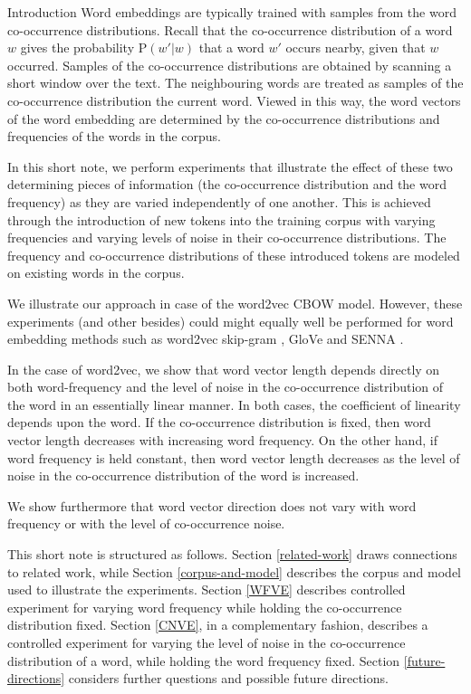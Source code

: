 \documentclass{article} %
\newcommand{\p}{\text{P}}
\begin{document}
\begin{section}{Introduction}
Word embeddings are typically trained with samples from the word co-occurrence distributions.
Recall that the co-occurrence distribution of a word $w$ gives the probability $\p(w'|w)$ that a word $w'$ occurs nearby, given that $w$ occurred.
Samples of the co-occurrence distributions are obtained by scanning a short window over the text.
The neighbouring words are treated as samples of the co-occurrence distribution the current word. 
Viewed in this way, the word vectors of the word embedding are determined by the co-occurrence distributions and frequencies of the words in the corpus.

In this short note, we perform experiments that illustrate the effect of these two determining pieces of information (the co-occurrence distribution and the word frequency) as they are varied independently of one another.
This is achieved through the introduction of new tokens into the training corpus with varying frequencies and varying levels of noise in their co-occurrence distributions.
The frequency and co-occurrence distributions of these introduced tokens are modeled on existing words in the corpus.

We illustrate our approach in case of the word2vec CBOW model.
However, these experiments (and other besides) could might equally well be performed for word embedding methods such as word2vec skip-gram \cite{DistRepns,EfficientEstimation}, GloVe \cite{pennington2014glove} and SENNA \cite{collobert-2011}.

In the case of word2vec, we show that word vector length depends directly on both word-frequency and the level of noise in the co-occurrence distribution of the word in an essentially linear manner.
In both cases, the coefficient of linearity depends upon the word.
If the co-occurrence distribution is fixed, then word vector length decreases with increasing word frequency.
On the other hand, if word frequency is held constant, then word vector length decreases as the level of  noise in the co-occurrence distribution of the word is increased.

We show furthermore that word vector direction does not vary with word frequency or with the level of co-occurrence noise.

This short note is structured as follows.
Section \ref{related-work} draws connections to related work, while Section \ref{corpus-and-model} describes the corpus and model used to illustrate the experiments.
Section \ref{WFVE} describes controlled experiment for varying word frequency while holding the co-occurrence distribution fixed.
Section \ref{CNVE}, in a complementary fashion, describes a controlled experiment for varying the level of noise in the co-occurrence distribution of a word, while holding the word frequency fixed.
Section \ref{future-directions} considers further questions and possible future directions.
\end{section}
\end{document}
